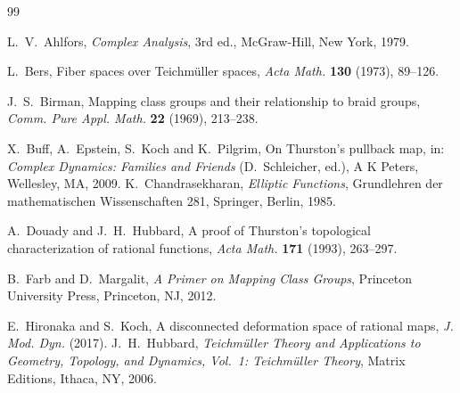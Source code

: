 \documentclass[11pt]{article}
\theoremstyle{definition}
\begin{document}
\begin{thebibliography}{99}

 L.~V.~Ahlfors, \emph{Complex Analysis}, 3rd ed., McGraw-Hill, New York, 1979.

 L.~Bers, Fiber spaces over Teichm\"uller spaces, \emph{Acta Math.} \textbf{130} (1973), 89--126.

 J.~S.~Birman, Mapping class groups and their relationship to braid groups, \emph{Comm. Pure Appl. Math.} \textbf{22} (1969), 213--238.

 X.~Buff, A.~Epstein, S.~Koch and K.~Pilgrim, On Thurston's pullback map, in: \emph{Complex Dynamics: Families and Friends} (D.~Schleicher, ed.), A K Peters, Wellesley, MA, 2009.
 K.~Chandrasekharan, \emph{Elliptic Functions}, Grundlehren der mathematischen Wissenschaften 281, Springer, Berlin, 1985.

 A.~Douady and J.~H.~Hubbard, A proof of Thurston's topological characterization of rational functions, \emph{Acta Math.} \textbf{171} (1993), 263--297.

 B.~Farb and D.~Margalit, \emph{A Primer on Mapping Class Groups}, Princeton University Press, Princeton, NJ, 2012.

 E.~Hironaka and S.~Koch, A disconnected deformation space of rational maps, \emph{J. Mod. Dyn.} (2017).
 J.~H.~Hubbard, \emph{Teichm\"uller Theory and Applications to Geometry, Topology, and Dynamics, Vol.~1: Teichm\"uller Theory}, Matrix Editions, Ithaca, NY, 2006.

\end{thebibliography}
\end{document}
